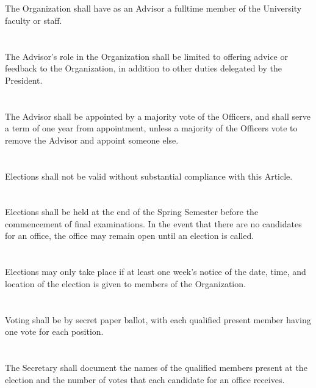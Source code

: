 \documentclass[12pt]{cls/constitution}
\begin{document}
\section{}
The Organization shall have as an Advisor a fulltime member of the University faculty or staff.

\section{}
The Advisor’s role in the Organization shall be limited to offering advice or feedback to the Organization, in addition to other duties delegated by the President.

\section{}
The Advisor shall be appointed by a majority vote of the Officers, and shall serve a term of one year from appointment, unless a majority of the Officers vote to remove the Advisor and appoint someone else. 


\section{}
Elections shall not be valid without substantial compliance with this Article. 

\section{}
Elections shall be held at the end of the Spring Semester before the commencement of final examinations.  In the event that there are no candidates for an office, the office may remain open until an election is called.

\section{}
Elections may only take place if at least one week’s notice of the date, time, and location of the election is given to members of the Organization.

\section{}
Voting shall be by secret paper ballot, with each qualified present member having one vote for each position.

\section{}
The Secretary shall document the names of the qualified members present at the election and the number of votes that each candidate for an office receives. 
\end{document}
